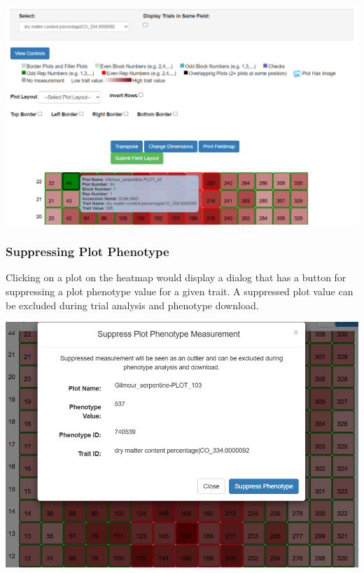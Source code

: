 \documentclass[
  12pt,
]{book}
\begin{document}
\begin{center}\includegraphics[width=0.95\linewidth]{assets/images/heatmap_assayed_trait_view} \end{center}

\hypertarget{suppressing-plot-phenotype}{%
\subsubsection*{Suppressing Plot Phenotype}\label{suppressing-plot-phenotype}}


Clicking on a plot on the heatmap would display a dialog that has a button for suppressing a plot phenotype value for a given trait. A suppressed plot value can be excluded during trial analysis and phenotype download.

\begin{center}\includegraphics[width=0.95\linewidth]{assets/images/trial_detail_page_suppress_phenotype} \end{center}
\end{document}
